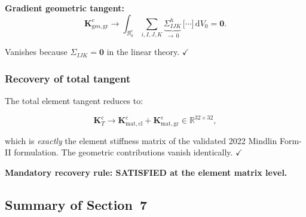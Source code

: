 \documentclass[11pt]{article}
\begin{document}
\textbf{Gradient geometric tangent:}
\begin{equation}
\mathbf{K}_{\mathrm{geo,gr}}^{e}
\to \int_{\mathcal{B}_{0}^{e}}
  \sum_{i,I,J,K}
  \underbrace{\Sigma_{IJK}^{h}}_{\to\,0}\,
  \bigl[\cdots\bigr]\,
  \mathrm{d}V_{0}
= \mathbf{0}.
\end{equation}

Vanishes because $\Sigma_{IJK}=\mathbf{0}$ in the linear theory. $\checkmark$

\subsubsection{Recovery of total tangent}

The total element tangent reduces to:

\begin{equation}
\boxed{
\mathbf{K}_{T}^{e}
\to \mathbf{K}_{\mathrm{mat,cl}}^{e}
+ \mathbf{K}_{\mathrm{mat,gr}}^{e}
\in \mathbb{R}^{32\times 32},
}
\label{s7:K_2022}
\end{equation}

which is \emph{exactly} the element stiffness matrix of the validated
2022 Mindlin Form-II formulation. The geometric contributions vanish
identically. $\checkmark$

\textbf{Mandatory recovery rule: SATISFIED at the element matrix level.}

\subsection{Summary of Section~7}
\label{ssec:summary}
\end{document}
